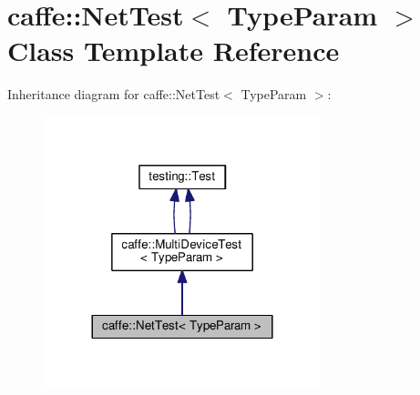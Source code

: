\hypertarget{classcaffe_1_1_net_test}{}\section{caffe\+:\+:Net\+Test$<$ Type\+Param $>$ Class Template Reference}
\label{classcaffe_1_1_net_test}


Inheritance diagram for caffe\+:\+:Net\+Test$<$ Type\+Param $>$\+:
\nopagebreak
\begin{figure}[H]
\begin{center}
\leavevmode
\includegraphics[width=228pt]{classcaffe_1_1_net_test__inherit__graph}
\end{center}
\end{figure}
